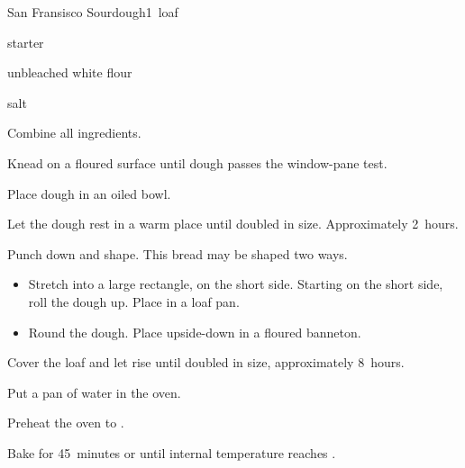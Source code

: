 \begin{recipe}{San Fransisco Sourdough}{}{1~loaf}

\begin{ingredients}
\item {} starter
\item {} unbleached white flour
\item {} salt
\end{ingredients}

\begin{directions}
\item Combine all ingredients.
\item Knead on a floured surface until dough passes the window-pane test.
\item Place dough in an oiled bowl.
\item Let the dough rest in a warm place until doubled in size. Approximately 2~hours.
\item Punch down and shape.
This bread may be shaped two ways.
\begin{itemize}
\item Stretch into a large rectangle,  on the short side. Starting on the short side, roll the dough up. Place in a loaf pan.
\item Round the dough. Place upside-down in a floured banneton.
\end{itemize}
\item Cover the loaf and let rise until doubled in size, approximately 8~hours.
\item Put a pan of water in the oven.
\item Preheat the oven to .
\item Bake for 45~minutes or until internal temperature reaches .
\end{directions}
\end{recipe}
